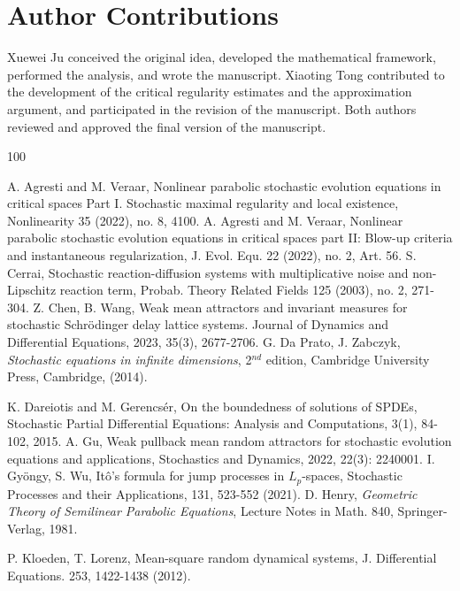 \documentclass[10pt]{article}
\numberwithin{figure}{section}
\numberwithin{equation}{section}
\newcommand{\0}{{\theta}}
\begin{document}
\section*{Author Contributions}
Xuewei Ju conceived the original idea, developed the mathematical framework, performed the analysis, and wrote the manuscript. Xiaoting Tong contributed to the development of the critical regularity estimates and the approximation argument, and participated in the revision of the manuscript. Both authors reviewed and approved the final version of the manuscript.
\begin{thebibliography}{100}




 A. Agresti and M. Veraar, Nonlinear parabolic stochastic evolution equations in critical spaces Part I. Stochastic maximal regularity and local existence, Nonlinearity 35 (2022), no. 8, 4100.
 A. Agresti and M. Veraar, Nonlinear parabolic stochastic evolution equations in critical spaces part II: Blow-up criteria and instantaneous regularization, J. Evol. Equ. 22 (2022), no. 2, Art. 56. 
 S. Cerrai, Stochastic reaction-diffusion systems with multiplicative noise and non-Lipschitz reaction term, Probab. Theory Related Fields 125 (2003), no. 2, 271-304.
 Z. Chen, B. Wang,  Weak mean attractors and invariant measures for stochastic Schrödinger delay lattice systems. Journal of Dynamics and Differential Equations, 2023, 35(3), 2677-2706.
 G. Da Prato, J. Zabczyk, \emph{Stochastic equations in infinite dimensions}, 2$^{nd}$ edition, Cambridge University Press, Cambridge, (2014).
    
  K. Dareiotis and M. Gerencs\'er, On the boundedness of solutions of SPDEs, Stochastic Partial Differential Equations: Analysis and Computations, 3(1), 84-102, 2015.   
 A. Gu, Weak pullback mean random attractors for stochastic evolution equations and applications, Stochastics and Dynamics, 2022, 22(3): 2240001.
 I. Gy\"ongy, S. Wu, It\^o's formula for jump processes in $L_p$-spaces, Stochastic Processes and their Applications, 131, 523-552 (2021).
 D. Henry, \emph{Geometric Theory of Semilinear Parabolic Equations}, Lecture Notes in Math. 840, Springer-Verlag, 1981.

 P. Kloeden, T. Lorenz, Mean-square random dynamical systems, J. Differential Equations. 253, 1422-1438 (2012).


\end{thebibliography}
\end{document}
